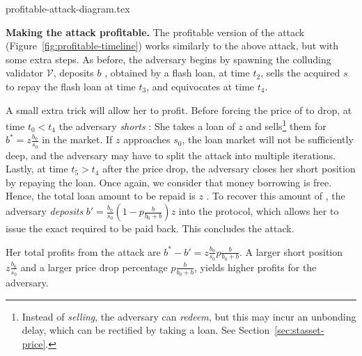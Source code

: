 {profitable-attack-diagram.tex}

\noindent
\textbf{Making the attack profitable.}
The profitable version of the attack (Figure~\ref{fig:profitable-timeline}) works similarly to the above
attack, but with some extra steps. As before, the adversary begins by spawning the
colluding validator $\mathcal{V}$, deposits $b$ \asset, obtained by a flash loan, at time $t_2$,
sells the acquired $s$ \stasset to repay the flash loan at time $t_3$, and equivocates at time $t_4$.

A small extra trick will allow her to profit.
Before forcing the price of \stasset to drop, at time $t_0 < t_4$
the adversary \emph{shorts}
\stasset: She takes a loan of $z$ \stassets and
sells\footnote{Instead of \emph{selling}, the adversary can \emph{redeem}, but
this may incur an unbonding delay, which can be rectified by taking a loan.
See Section~\ref{sec:stasset-price}.}
them for $b^* = z \frac{b_0}{s_0}$ \asset in the market.
If $z$ approaches $s_0$, the loan market will not be sufficiently deep,
and the adversary may have to split the attack into multiple iterations.
Lastly, at time $t_5 > t_4$ after the price drop, the adversary closes her short position by repaying the
\stasset loan. Once again, we consider that money borrowing is free. Hence,
the total loan amount to be repaid is $z$ \stasset.
To recover this amount of \stasset, the adversary \emph{deposits}
$b' = \frac{b_0}{s_0}(1 - p\frac{b}{b_0 + b}) z$ \asset
into the protocol, which allows her to issue the exact required \stasset
to be paid back. This concludes the attack.

Her total profits from the attack are
$b^* - b' = z \frac{b_0}{s_0} p \frac{b}{b_0 + b}$.
A larger short position $z \frac{b_0}{s_0}$ and a larger
\stasset price drop percentage $p \frac{b}{b_0 + b}$, yields higher profits for the adversary.




%
%
